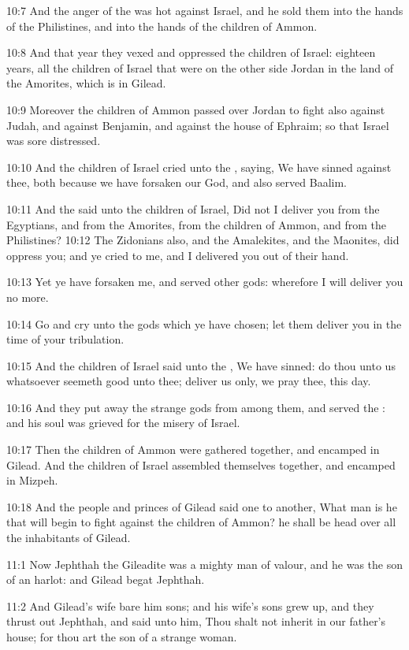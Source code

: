 10:7 And the anger of the \LORD was hot against Israel, and he sold
them into the hands of the Philistines, and into the hands of the
children of Ammon.

10:8 And that year they vexed and oppressed the children of Israel:
eighteen years, all the children of Israel that were on the other side
Jordan in the land of the Amorites, which is in Gilead.

10:9 Moreover the children of Ammon passed over Jordan to fight also
against Judah, and against Benjamin, and against the house of Ephraim;
so that Israel was sore distressed.

10:10 And the children of Israel cried unto the \LORD, saying, We have
sinned against thee, both because we have forsaken our God, and also
served Baalim.

10:11 And the \LORD said unto the children of Israel, Did not I deliver
you from the Egyptians, and from the Amorites, from the children of
Ammon, and from the Philistines?  10:12 The Zidonians also, and the
Amalekites, and the Maonites, did oppress you; and ye cried to me, and
I delivered you out of their hand.

10:13 Yet ye have forsaken me, and served other gods: wherefore I will
deliver you no more.

10:14 Go and cry unto the gods which ye have chosen; let them deliver
you in the time of your tribulation.

10:15 And the children of Israel said unto the \LORD, We have sinned:
do thou unto us whatsoever seemeth good unto thee; deliver us only, we
pray thee, this day.

10:16 And they put away the strange gods from among them, and served
the \LORD: and his soul was grieved for the misery of Israel.

10:17 Then the children of Ammon were gathered together, and encamped
in Gilead. And the children of Israel assembled themselves together,
and encamped in Mizpeh.

10:18 And the people and princes of Gilead said one to another, What
man is he that will begin to fight against the children of Ammon? he
shall be head over all the inhabitants of Gilead.

11:1 Now Jephthah the Gileadite was a mighty man of valour, and he was
the son of an harlot: and Gilead begat Jephthah.

11:2 And Gilead's wife bare him sons; and his wife's sons grew up, and
they thrust out Jephthah, and said unto him, Thou shalt not inherit in
our father's house; for thou art the son of a strange woman.

